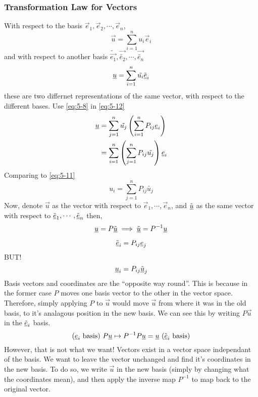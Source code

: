 \documentclass{article}
\numberwithin{equation}{section}
\begin{document}
\subsubsection{Transformation Law for Vectors}
With respect to the basis $\vec e_1, \vec e_2, \cdots, \vec e_n$, 
\begin{equation}\label{eq:5-11}
    \vec u = \sum_{i=1}^{n} u_i \vec e_i
\end{equation}
and with respect to another basis $\tilde{\vec{e_1}}, \vec{\tilde{e_2}}, \cdots, \vec{\tilde{e_n}}$
\begin{equation}\label{eq:5-12}
    \underline{u} = \sum_{i=1}^{n} \tilde{u_i} \tilde{\underline{e}}_i
\end{equation}
these are two differnet representations of the same vector, with respect to the different bases.
Use \eqref{eq:5-8} in \eqref{eq:5-12}
\begin{align*}
    \underline{u} &= \sum_{j=1}^{n} \tilde{u_j} \left( \sum_{i=1}^{n}P_{ij} \underline{e}_i \right) \\
    &= \sum_{i=1}^{n} \left( \sum_{j=1}^{n}P_{ij}\tilde{u_j} \right) \underline{e}_i
\end{align*}
Comparing to \eqref{eq:5-11}
\[
    u_i = \sum_{j=1}^{n}P_{ij}\tilde{u_j}
\]
Now, denote $\vec u$ as the vector with respect to $\vec e_1, \cdots, \vec e_n$,
and $\tilde{\underline{u}}$ as the same vector with respect to $\tilde{\underline{e}}_1, \cdots, \tilde{\underline{e}}_n$ then,
\begin{equation}\label{eq:5-13}
    \underline{u} = P \tilde{\underline{u}} \implies \tilde{\underline{u}} = P^{-1} \underline{u} 
\end{equation}
\begin{remark}
    \[
        \tilde{\underline{e}}_i = P_{ij} \underline{e}_j  
    \]
    BUT!
    \[
        \underline{u}_i = P_{ij} \tilde{\underline{u}}_j
    \]
    Basis vectors and coordinates are the ``opposite way round''. 
    This is because in the former case $P$ moves one basis vector to the other in the vector space.
    Therefore, simply applying $P$ to $\vec u$ would move $\vec u$ from where it was in the old basis,
    to it's analagous position in the new basis. We can see this by writing $P \vec u$ in the $\tilde{\underline{e}}_i$ basis.
    \[
       \text{($\underline{e}_i$ basis) } P \underline{u} \mapsto P^{-1} P \underline{u} = \underline{u}  \text{ ($\tilde{\underline{e}}_i$ basis)}
    \]
    However, that is not what we want!
    Vectors exist in a vector space independant of the basis. 
    We want to leave the vector unchanged and find it's coordinates in the new basis.
    To do so, we write $\vec u$ in the new basis (simply by changing what the coordinates mean),
    and then apply the inverse map $P^{-1}$ to map back to the original vector.
\end{remark}
\end{document}
